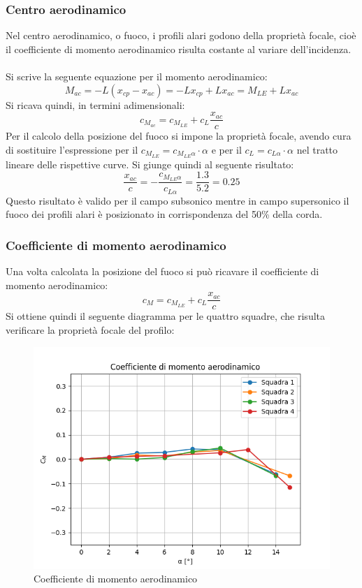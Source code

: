 \subsubsection{Centro aerodinamico}
Nel centro aerodinamico, o fuoco, i profili alari godono della proprietà focale, cioè il coefficiente di momento aerodinamico risulta costante al variare dell'incidenza.\\\\
Si scrive la seguente equazione per il momento aerodinamico:
\begin{equation*}
    M_{ac} = -L(x_{cp} - x_{ac}) = -Lx_{cp} + Lx_{ac} = M_{LE} + Lx_{ac}
\end{equation*}
Si ricava quindi, in termini adimensionali:
\begin{equation*}
    c_{M_{ac}} = c_{M_{LE}} + c_L \frac{x_{ac}}c
\end{equation*}
Per il calcolo della posizione del fuoco si impone la proprietà focale, avendo cura di sostituire l'espressione per il $c_{M_{LE}}=c_{M_{LE}\alpha}\cdot\alpha$ e per il $c_L=c_{L\alpha}\cdot\alpha$ nel tratto lineare delle rispettive curve. Si giunge quindi al seguente risultato:
\begin{equation*}
    \frac{x_{ac}}c = - \frac{c_{M_{LE}\alpha}}{c_{L\alpha}} = \frac{1.3}{5.2} = 0.25
\end{equation*}
Questo risultato è valido per il campo subsonico mentre in campo supersonico il fuoco dei profili alari è posizionato in corrispondenza del 50\% della corda.

\subsubsection{Coefficiente di momento aerodinamico}
Una volta calcolata la posizione del fuoco si può ricavare il coefficiente di momento aerodinamico:
\begin{equation*}
    c_M = c_{M_{LE}} + c_L \frac{x_{ac}}c
\end{equation*}
Si ottiene quindi il seguente diagramma per le quattro squadre, che risulta verificare la proprietà focale del profilo:
\begin{figure}[H]
    \centering
    \includegraphics[width=.65\textwidth]{images/5/cm.png}
    \caption {Coefficiente di momento aerodinamico}
\end{figure}